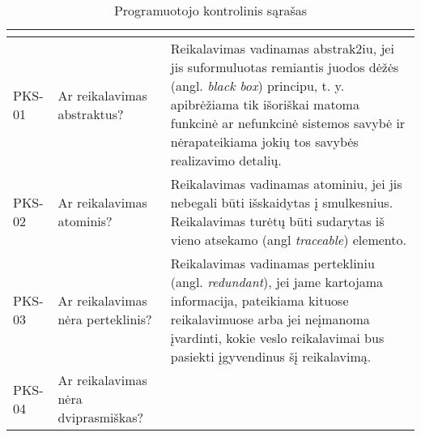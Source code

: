 \documentclass{VUMIFPSkursinis}
\begin{document}
\begin{center}
	\small
	\begin{longtable}{|C{2cm}|L{5cm}|L{8cm}|}
		\caption{Programuotojo kontrolinis sąrašas}
		\label{table:EmployeeSalary}
		\\ \hline
		                               &
		                   &
		\\ \hline
		PKS-01                                                                        &
		Ar reikalavimas abstraktus?                                                   &
		Reikalavimas vadinamas abstrak2iu, jei jis suformuluotas remiantis juodos dėžės (angl. \textit{black box}) principu, t. y. apibrėžiama tik išoriškai matoma funkcinė ar nefunkcinė sistemos savybė ir nėrapateikiama jokių tos savybės realizavimo detalių.                                                                                                                                                                                   \\ \hline
		PKS-02                                                                        &
		Ar reikalavimas atominis?                                                     &
		Reikalavimas vadinamas atominiu, jei jis nebegali būti išskaidytas į smulkesnius. Reikalavimas turėtų būti sudarytas iš vieno atsekamo (angl \textit{traceable}) elemento.                                                                                                                                                                                                                                                                    \\ \hline
		PKS-03                                                                        &
		Ar reikalavimas nėra perteklinis?                                             &
		Reikalavimas vadinamas pertekliniu (angl. \textit{redundant}), jei jame kartojama informacija, pateikiama kituose reikalavimuose arba jei neįmanoma įvardinti, kokie veslo reikalavimai bus pasiekti įgyvendinus šį reikalavimą.                                                                                                                                                                                                              \\ \hline
		PKS-04                                                                        &
		Ar reikalavimas nėra dviprasmiškas?                                           &

\end{longtable}
\end{center}
\end{document}
